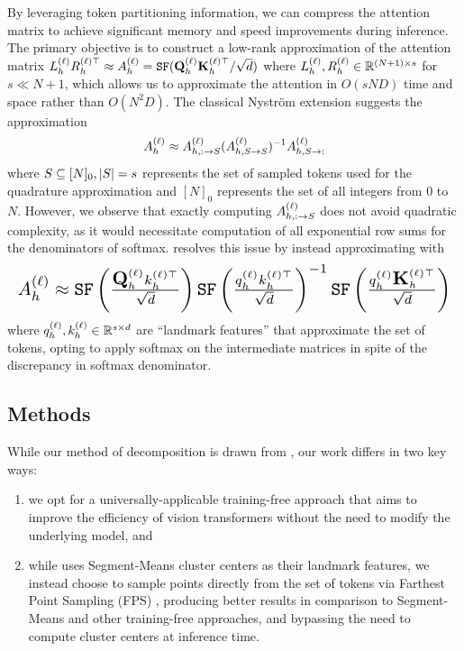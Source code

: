 \documentclass[10pt,twocolumn,letterpaper]{article}
\begin{document}
By leveraging token partitioning information, we can compress the attention matrix to achieve significant memory and speed improvements during inference. The primary objective is to construct a low-rank approximation of the attention matrix $L^{(\ell)}_hR_h^{(\ell)\top} \approx A^{(\ell)}_h = \texttt{SF}(\mbox{{\bfseries Q}}^{(\ell)}_h \mbox{{\bfseries K}}^{(\ell)\top}_h / \sqrt{d})$ where $L^{(\ell)}_h, R^{(\ell)}_h \in \mathbb{R}^{(N + 1) \times s}$ for $s \ll N + 1$, which allows us to approximate the attention in $O(sND)$ time and space rather than $O(N^2D)$. The classical Nystr\"om extension suggests the approximation
\vspace{-4pt} \begin{align}
    A^{(\ell)}_h
    \approx A^{(\ell)}_{h, : \to S} (A^{(\ell)}_{h, S \to S})^{-1} A^{(\ell)}_{h, S \to :}
\end{align} where $S \subseteq [N]_0, \left\lvert S \right\rvert = s$ represents the set of sampled tokens used for the quadrature approximation and $[N]_0$ represents the set of all integers from $0$ to $N$. However, we observe that exactly computing $A^{(\ell)}_{h, : \to S}$ does not avoid quadratic complexity, as it would necessitate computation of all exponential row sums for the denominators of softmax. \cite{xiong2021nystromformer} resolves this issue by instead approximating with \vspace{-4pt} \begin{align}
    \resizebox{\columnwidth}{!}{$
        \Al{\ell}_h
        \approx \sf\pfrac{\Ql{\ell}_h k^{(\ell)\top}_h}{\sqrt{d}} \sf\pfrac{\ql{\ell}_h k^{(\ell)\top}_h}{\sqrt{d}}^{-1} \sf\pfrac{\ql{\ell}_h \mbf{K}^{(\ell)\top}_h}{\sqrt{d}}
    $}
\end{align}
where $q^{(\ell)}_h, k^{(\ell)}_h \in \mathbb{R}^{s \times d}$ are ``landmark features'' that approximate the set of tokens, opting to apply softmax on the intermediate matrices in spite of the discrepancy in softmax denominator.









\subsection{Methods}

While our method of decomposition is drawn from \cite{xiong2021nystromformer}, our work differs in two key ways: 
\begin{enumerate}[label=\arabic*)]
    \item we opt for a universally-applicable training-free approach that aims to improve the efficiency of vision transformers without the need to modify the underlying model, and
    \vspace{-0.2cm}
    \item while \cite{xiong2021nystromformer} uses Segment-Means cluster centers as their landmark features, we instead choose to sample points directly from the set of tokens via Farthest Point Sampling (FPS) \cite{qi2017fps}, producing better results in comparison to Segment-Means and other training-free approaches, and bypassing the need to compute cluster centers at inference time.
\end{enumerate}
\end{document}
